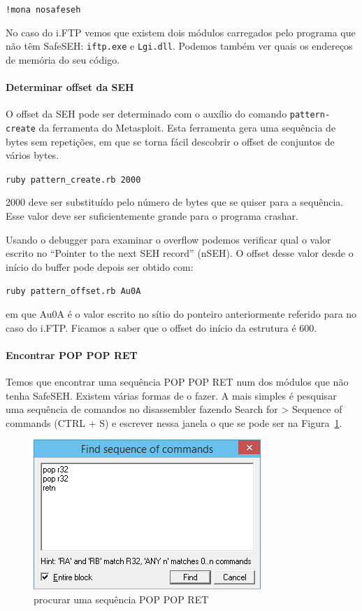 \documentclass[a4paper]{article}
\begin{document}
	\texttt{!mona nosafeseh}

No caso do i.FTP vemos que existem dois módulos carregados pelo programa que não têm SafeSEH: \texttt{iftp.exe} e \texttt{Lgi.dll}. Podemos também ver quais os endereços de memória do seu código.

\paragraph*{Determinar offset da SEH} O offset da SEH pode ser determinado com o auxílio do comando \texttt{pattern-create} da ferramenta do Metasploit. Esta ferramenta gera uma sequência de bytes sem repetições, em que se torna fácil descobrir o offset de conjuntos de vários bytes.

	\texttt{ruby pattern\_create.rb 2000}

2000 deve ser substituído pelo número de bytes que se quiser para a sequência. Esse valor deve ser suficientemente grande para o programa crashar.

Usando o debugger para examinar o overflow podemos verificar qual o valor escrito no ``Pointer to the next SEH record'' (nSEH). O offset desse valor desde o início do buffer pode depois ser obtido com:

	\texttt{ruby pattern\_offset.rb Au0A}

em que Au0A é o valor escrito no sítio do ponteiro anteriormente referido para no caso do i.FTP. Ficamos a saber que o offset do início da estrutura é 600.

\paragraph*{Encontrar POP POP RET} Temos que encontrar uma sequência POP POP RET num dos módulos que não tenha SafeSEH. Existem várias formas de o fazer. A mais simples é pesquisar uma sequência de comandos no disassembler fazendo Search for > Sequence of commands (CTRL + S) e escrever nessa janela o que se pode ser na Figura~\ref{find_POPPOPRET}.

\begin{figure}
	\centering
	\includegraphics[scale=1]{find_POPPOPRET}
	\caption{procurar uma sequência POP POP RET}
	\label{find_POPPOPRET}
\end{figure}
\end{document}
